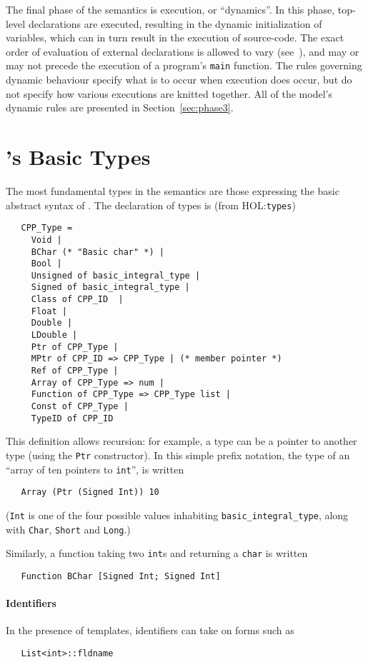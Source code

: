 \documentclass[11pt]{article}
\newcommand{\HOLfile}[1]{HOL:\texttt{#1}}
\begin{document}
The final phase of the semantics is execution, or ``dynamics''.  In
this phase, top-level declarations are executed, resulting in the
dynamic initialization of variables, which can in turn result in the
execution of source-code.  The exact order of evaluation of external
declarations is allowed to vary
(see~\cite[\S3.6.2]{cpp-standard-iso14882}), and may or may not
precede the execution of a program's \texttt{main} function.  The
rules governing dynamic behaviour specify what is to occur when
execution does occur, but do not specify how various executions are
knitted together.  All of the model's dynamic rules are presented in
Section~\ref{sec:phase3}.

\section{\cpp's Basic Types}
\label{sec:basic-types}

The most fundamental types in the semantics are those expressing the
basic abstract syntax of \cpp{}.  The declaration of \cpp{} types is
(from \HOLfile{types})
\begin{verbatim}
   CPP_Type =
     Void |
     BChar (* "Basic char" *) |
     Bool |
     Unsigned of basic_integral_type |
     Signed of basic_integral_type |
     Class of CPP_ID  |
     Float |
     Double |
     LDouble |
     Ptr of CPP_Type |
     MPtr of CPP_ID => CPP_Type | (* member pointer *)
     Ref of CPP_Type |
     Array of CPP_Type => num |
     Function of CPP_Type => CPP_Type list |
     Const of CPP_Type |
     TypeID of CPP_ID
\end{verbatim}
This definition allows recursion: for example, a \cpp{} type can be a
pointer to another \cpp{} type (using the \texttt{Ptr}
constructor).  In this simple prefix notation, the type of an
``array of ten pointers to \texttt{int}'', is written
\begin{verbatim}
   Array (Ptr (Signed Int)) 10
\end{verbatim}
(\texttt{Int} is one of the four possible values inhabiting
\texttt{basic_integral_type}, along with \texttt{Char}, \texttt{Short}
and \texttt{Long}.)

Similarly, a function taking two \texttt{int}s and returning a
\texttt{char} is written
\begin{verbatim}
   Function BChar [Signed Int; Signed Int]
\end{verbatim}

\paragraph{Identifiers}
In the presence of templates, identifiers can take on forms such as
\begin{verbatim}
   List<int>::fldname
\end{verbatim}
\end{document}
